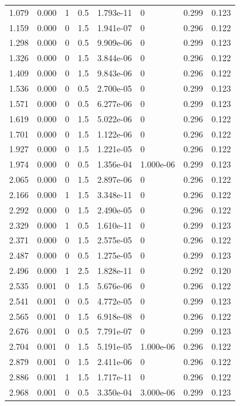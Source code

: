 \documentclass[preview]{standalone}
\begin{document}
{{\begin{tabular}{L{1.2cm}C{1.2cm} C{0.3cm}C{0.5cm} C{1.4cm}C{1.4cm} C{1.4cm}C{1.4cm}}
  1.079  &  0.000  & 1     & 0.5 &  1.793e-11  & 0  & 0.299 &  0.123   \\ 
  1.159  &  0.000  & 0     & 1.5 &  1.941e-07  & 0  & 0.296 &  0.122   \\ 
  1.298  &  0.000  & 0     & 0.5 &  9.909e-06  & 0  & 0.299 &  0.123   \\ 
  1.326  &  0.000  & 0     & 1.5 &  3.844e-06  & 0  & 0.296 &  0.122   \\ 
  1.409  &  0.000  & 0     & 1.5 &  9.843e-06  & 0  & 0.296 &  0.122   \\ 
  1.536  &  0.000  & 0     & 0.5 &  2.700e-05  & 0  & 0.299 &  0.123   \\ 
  1.571  &  0.000  & 0     & 0.5 &  6.277e-06  & 0  & 0.299 &  0.123   \\ 
  1.619  &  0.000  & 0     & 1.5 &  5.022e-06  & 0  & 0.296 &  0.122   \\ 
  1.701  &  0.000  & 0     & 1.5 &  1.122e-06  & 0  & 0.296 &  0.122   \\ 
  1.927  &  0.000  & 0     & 1.5 &  1.221e-05  & 0  & 0.296 &  0.122   \\ 
  1.974  &  0.000  & 0     & 0.5 &  1.356e-04  & 1.000e-06  & 0.299 &  0.123   \\ 
  2.065  &  0.000  & 0     & 1.5 &  2.897e-06  & 0  & 0.296 &  0.122   \\ 
  2.166  &  0.000  & 1     & 1.5 &  3.348e-11  & 0  & 0.296 &  0.122   \\ 
  2.292  &  0.000  & 0     & 1.5 &  2.490e-05  & 0  & 0.296 &  0.122   \\ 
  2.329  &  0.000  & 1     & 0.5 &  1.610e-11  & 0  & 0.299 &  0.123   \\ 
  2.371  &  0.000  & 0     & 1.5 &  2.575e-05  & 0  & 0.296 &  0.122   \\ 
  2.487  &  0.000  & 0     & 0.5 &  1.275e-05  & 0  & 0.299 &  0.123   \\ 
  2.496  &  0.000  & 1     & 2.5 &  1.828e-11  & 0  & 0.292 &  0.120   \\ 
  2.535  &  0.001  & 0     & 1.5 &  5.676e-06  & 0  & 0.296 &  0.122   \\ 
  2.541  &  0.001  & 0     & 0.5 &  4.772e-05  & 0  & 0.299 &  0.123   \\ 
  2.565  &  0.001  & 0     & 1.5 &  6.918e-08  & 0  & 0.296 &  0.122   \\ 
  2.676  &  0.001  & 0     & 0.5 &  7.791e-07  & 0  & 0.299 &  0.123   \\ 
  2.704  &  0.001  & 0     & 1.5 &  5.191e-05  & 1.000e-06  & 0.296 &  0.122   \\ 
  2.879  &  0.001  & 0     & 1.5 &  2.411e-06  & 0  & 0.296 &  0.122   \\ 
  2.886  &  0.001  & 1     & 1.5 &  1.717e-11  & 0  & 0.296 &  0.122   \\ 
  2.968  &  0.001  & 0     & 0.5 &  3.350e-04  & 3.000e-06  & 0.299 &  0.123   \\ 
\hline 
\end{tabular} 

}}
\end{document}
